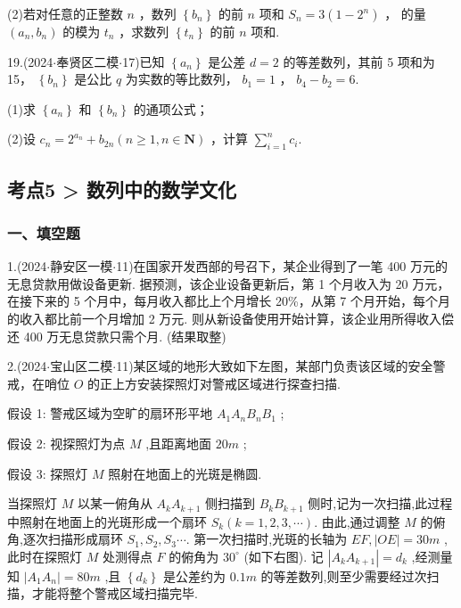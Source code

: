(2)若对任意的正整数 $n$ ，数列 $\left\{  {b}_{n}\right\}$ 的前 $n$ 项和 ${S}_{n} = 3\left( {1 - {2}^{n}}\right)$ ， 的量 $\left( {{a}_{n},{b}_{n}}\right)$ 的模为 ${t}_{n}$ ，求数列 $\left\{  {t}_{n}\right\}$ 的前 $n$ 项和.

19.(2024$\cdot$奉贤区二模$\cdot$17)已知 $\left\{  {a}_{n}\right\}$ 是公差 $d = 2$ 的等差数列，其前 5 项和为 15， $\left\{  {b}_{n}\right\}$ 是公比 $q$ 为实数的等比数列， ${b}_{1} = 1$ ， ${b}_{4} - {b}_{2} = 6$.

(1)求 $\left\{  {a}_{n}\right\}$ 和 $\left\{  {b}_{n}\right\}$ 的通项公式；

(2)设 ${c}_{n} = {2}^{{a}_{n}} + {b}_{2n}\left( {n \geq  1,n \in  \mathbf{N}}\right)$ ，计算 $\mathop{\sum }\limits_{{i = 1}}^{n}{c}_{i}$.

\subsection*{考点5 > 数列中的数学文化}

\subsubsection*{一、填空题}

1.(2024$\cdot$静安区一模$\cdot$11)在国家开发西部的号召下，某企业得到了一笔 400 万元的无息贷款用做设备更新. 据预测，该企业设备更新后，第 1 个月收入为 20 万元，在接下来的 5 个月中，每月收入都比上个月增长 20\%，从第 7 个月开始，每个月的收入都比前一个月增加 2 万元. 则从新设备使用开始计算，该企业用所得收入偿还 400 万无息贷款只需\blkda[2]{}个月. (结果取整)

2.(2024$\cdot$宝山区二模$\cdot$11)某区域的地形大致如下左图，某部门负责该区域的安全警戒，在哨位 $O$ 的正上方安装探照灯对警戒区域进行探查扫描.

假设 1: 警戒区域为空旷的扇环形平地 ${A}_{1}{A}_{n}{B}_{n}{B}_{1}$ ;

假设 2: 视探照灯为点 $M$ ,且距离地面 ${20}{m}$ ;

假设 3: 探照灯 $M$ 照射在地面上的光斑是椭圆.

当探照灯 $M$ 以某一俯角从 ${A}_{k}{A}_{k + 1}$ 侧扫描到 ${B}_{k}{B}_{k + 1}$ 侧时,记为一次扫描,此过程中照射在地面上的光斑形成一个扇环 ${S}_{k}\left( {k = 1,2,3,\cdots }\right)$. 由此,通过调整 $M$ 的俯角,逐次扫描形成扇环 ${S}_{1},{S}_{2},{S}_{3}\cdots$. 第一次扫描时,光斑的长轴为 ${EF},\left| {OE}\right|  = {30}{m}$ ,此时在探照灯 $M$ 处测得点 $F$ 的俯角为 ${30}^{ \circ  }$ (如下右图). 记 $\left| {{A}_{k}{A}_{k + 1}}\right|  = {d}_{k}$ ,经测量知 $\left| {{A}_{1}{A}_{n}}\right|  = {80}{m}$ ,且 $\left\{  {d}_{k}\right\}$ 是公差约为 ${0.1}{m}$ 的等差数列,则至少需要经过\blkda[2]{}次扫描，才能将整个警戒区域扫描完毕.

